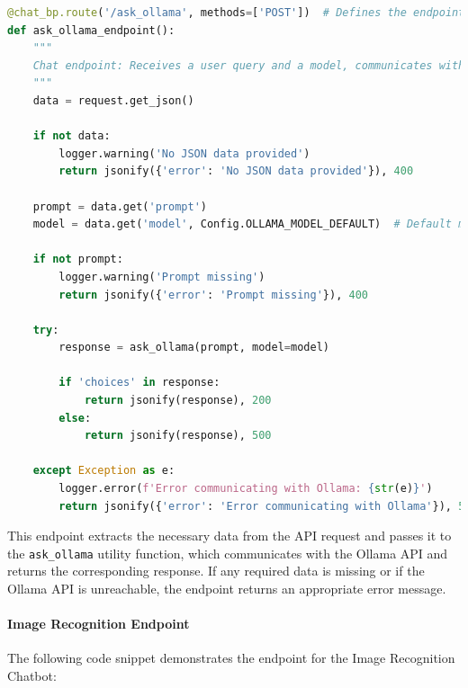 \begin{lstlisting}[language=Python]
@chat_bp.route('/ask_ollama', methods=['POST'])  # Defines the endpoint
def ask_ollama_endpoint():
    """
    Chat endpoint: Receives a user query and a model, communicates with Ollama, and returns the response.
    """
    data = request.get_json()

    if not data:
        logger.warning('No JSON data provided')
        return jsonify({'error': 'No JSON data provided'}), 400

    prompt = data.get('prompt')
    model = data.get('model', Config.OLLAMA_MODEL_DEFAULT)  # Default model

    if not prompt:
        logger.warning('Prompt missing')
        return jsonify({'error': 'Prompt missing'}), 400

    try:
        response = ask_ollama(prompt, model=model)

        if 'choices' in response:
            return jsonify(response), 200
        else:
            return jsonify(response), 500

    except Exception as e:
        logger.error(f'Error communicating with Ollama: {str(e)}')
        return jsonify({'error': 'Error communicating with Ollama'}), 500
\end{lstlisting}

This endpoint extracts the necessary data from the API request and passes it to the \texttt{ask\_ollama} utility function, which communicates with the Ollama API and returns the corresponding response. If any required data is missing or if the Ollama API is unreachable, the endpoint returns an appropriate error message.

\paragraph{Image Recognition Endpoint}
The following code snippet demonstrates the endpoint for the Image Recognition Chatbot:

